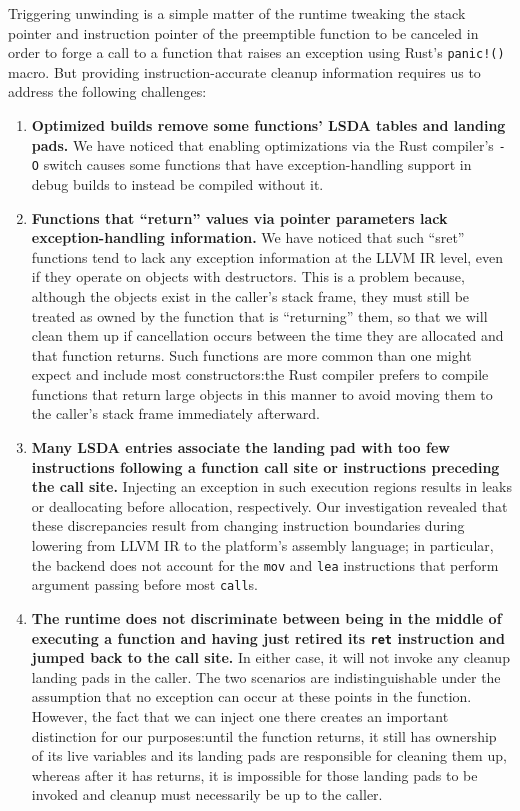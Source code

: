 Triggering unwinding is a simple matter of the runtime tweaking the stack pointer and
instruction pointer of the preemptible function to be canceled in order to forge a
call to a function that raises an exception using Rust's \texttt{panic!()} macro.
But providing instruction-accurate cleanup information requires us to address the
following challenges:
\begin{enumerate}
\item \textbf{Optimized builds remove some functions' LSDA tables and landing pads.}
We have noticed that enabling optimizations via the Rust compiler's \texttt{-O}
switch causes some functions that have exception-handling support in debug builds to
instead be compiled without it.

\item \textbf{Functions that ``return'' values via pointer parameters lack
exception-handling information.}  We have noticed that such ``sret'' functions tend
to lack any exception information at the LLVM IR level, even if they operate on
objects with destructors.  This is a problem because, although the objects exist in
the caller's stack frame, they must still be treated as owned by the function that is
``returning'' them, so that we will clean them up if cancellation occurs between the
time they are allocated and that function returns.  Such functions are more common
than one might expect and include most constructors:\@ the Rust compiler prefers to
compile functions that return large objects in this manner to avoid moving them to
the caller's stack frame immediately afterward.

\item \textbf{Many LSDA entries associate the landing pad with too few instructions
following a function call site or instructions preceding the call site.}  Injecting
an exception in such execution regions results in leaks or deallocating before
allocation, respectively.  Our investigation revealed that these discrepancies result
from changing instruction boundaries during lowering from LLVM IR to the platform's
assembly language; in particular, the backend does not account for the \texttt{mov}
and \texttt{lea} instructions that perform argument passing before most
\texttt{call}s.

\item \textbf{The runtime does not discriminate between being in the middle of
executing a function and having just retired its \texttt{ret} instruction and jumped
back to the call site.}  In either case, it will not invoke any cleanup landing pads
in the caller.  The two scenarios are indistinguishable under the assumption that no
exception can occur at these points in the function.  However, the fact that we can
inject one there creates an important distinction for our purposes:\@ until the
function returns, it still has ownership of its live variables and its landing pads
are responsible for cleaning them up, whereas after it has returns, it is impossible
for those landing pads to be invoked and cleanup must necessarily be up to the
caller.


\end{enumerate}
